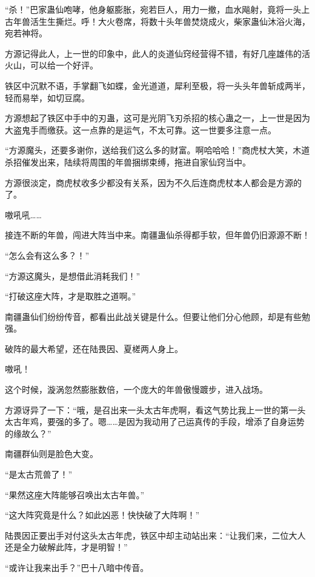 
\begin{this_body}

“杀！”巴家蛊仙咆哮，他身躯膨胀，宛若巨人，用力一撤，血水飚射，竟将一头上古年兽活生生撕烂。呼！大火卷席，将数十头年兽焚烧成火，柴家蛊仙沐浴火海，宛若神将。

方源记得此人，上一世的印象中，此人的炎道仙窍经营得不错，有好几座雄伟的活火山，可以给一个好评。

铁区中沉默不语，手掌翻飞如蝶，金光道道，犀利至极，将一头头年兽斩成两半，轻而易举，如切豆腐。

方源想起了铁区中手中的刃蛊，这可是光阴飞刃杀招的核心蛊之一，上一世是因为大盗鬼手而缴获。这一点靠的是运气，不太可靠。这一世要多注意一点。

“方源魔头，还要多谢你，送给我们这么多的财富。啊哈哈哈！”商虎杖大笑，木道杀招催发出来，陆续将周围的年兽捆绑束缚，拖进自家仙窍当中。

方源很淡定，商虎杖收多少都没有关系，因为不久后连商虎杖本人都会是方源的了。

嗷吼吼……

接连不断的年兽，闯进大阵当中来。南疆蛊仙杀得都手软，但年兽仍旧源源不断！

“怎么会有这么多？！”

“方源这魔头，是想借此消耗我们！”

“打破这座大阵，才是取胜之道啊。”

南疆蛊仙们纷纷传音，都看出此战关键是什么。但要让他们分心他顾，却是有些勉强。

破阵的最大希望，还在陆畏因、夏槎两人身上。

嗷吼！

这个时候，漩涡忽然膨胀数倍，一个庞大的年兽傲慢踱步，进入战场。

方源讶异了一下：“哦，是召出来一头太古年虎啊，看这气势比我上一世的第一头太古年鸡，要强的多了。嗯……是因为我动用了己运真传的手段，增添了自身运势的缘故么？”

南疆群仙则是脸色大变。

“是太古荒兽了！”

“果然这座大阵能够召唤出太古年兽。”

“这大阵究竟是什么？如此凶恶！快快破了大阵啊！”

陆畏因正要出手对付这头太古年虎，铁区中却主动站出来：“让我们来，二位大人还是全力破解此阵，才是明智！”

“或许让我来出手？”巴十八暗中传音。


\end{this_body}
